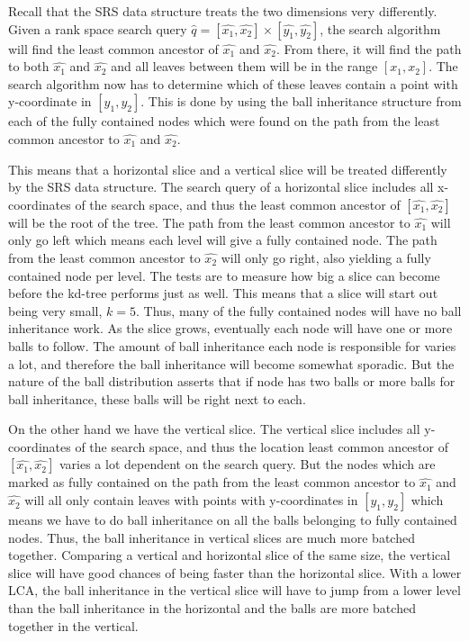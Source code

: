 Recall that the SRS data structure treats the two dimensions very differently. Given a rank space search query $\hat{q} = [\hat{x_1}, \hat{x_2}] \times [\hat{y_1}, \hat{y_2}]$, the search algorithm will find the least common ancestor of $\hat{x_1}$ and $\hat{x_2}$. From there, it will find the path to both $\hat{x_1}$ and $\hat{x_2}$ and all leaves between them will be in the range $[x_1, x_2]$. The search algorithm now has to determine which of these leaves contain a point with y-coordinate in $[y_1, y_2]$. This is done by using the ball inheritance structure from each of the fully contained nodes which were found on the path from the least common ancestor to $\hat{x_1}$ and $\hat{x_2}$.

This means that a horizontal slice and a vertical slice will be treated differently by the SRS data structure. The search query of a horizontal slice includes all x-coordinates of the search space, and thus the least common ancestor of $[\hat{x_1}, \hat{x_2}]$ will be the root of the tree. The path from the least common ancestor to $\hat{x_1}$ will only go left which means each level will give a fully contained node. The path from the least common ancestor to $\hat{x_2}$ will only go right, also yielding a fully contained node per level. The tests are to measure how big a slice can become before the kd-tree performs just as well. This means that a slice will start out being very small, $k=5$. Thus, many of the fully contained nodes will have no ball inheritance work. As the slice grows, eventually each node will have one or more balls to follow. The amount of ball inheritance each node is responsible for varies a lot, and therefore the ball inheritance will become somewhat sporadic. But the nature of the ball distribution asserts that if node has two balls or more balls for ball inheritance, these balls will be right next to each.

On the other hand we have the vertical slice. The vertical slice includes all y-coordinates of the search space, and thus the location least common ancestor of $[\hat{x_1}, \hat{x_2}]$ varies a lot dependent on the search query. But the nodes which are marked as fully contained on the path from the least common ancestor to $\hat{x_1}$ and $\hat{x_2}$ will all only contain leaves with points with y-coordinates in $[y_1, y_2]$ which means we have to do ball inheritance on all the balls belonging to fully contained nodes. Thus, the ball inheritance in vertical slices are much more batched together. Comparing a vertical and horizontal slice of the same size, the vertical slice will have good chances of being faster than the horizontal slice. With a lower LCA, the ball inheritance in the vertical slice will have to jump from a lower level than the ball inheritance in the horizontal and the balls are more batched together in the vertical. 

